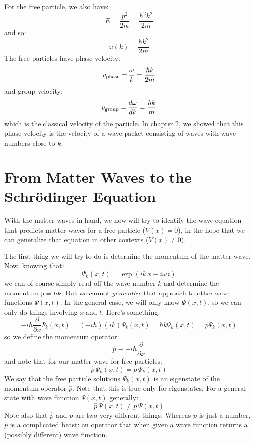\documentclass[12pt]{book}
\begin{document}
For the free particle, we also have:
\begin{equation}
E = \frac{p^2}{2m} = \frac{\hbar^2 k^2}{2m}
\end{equation}
and so:
\begin{equation}
\omega(k) = \frac{\hbar k^2}{2m} 
\end{equation}
The free particles have phase velocity:
$$v_{\rm phase} = \frac{\omega}{k} = \frac{\hbar k}{2m}$$
and group velocity:
$$v_{\rm group} = \frac{d\omega}{dk} = \frac{\hbar k}{m}$$
which is the classical velocity of the particle.  In chapter 2, we showed that this phase velocity is the velocity of a wave packet consisting of waves with wave numbers close to $k$.

 \section{From Matter Waves to the Schr\"odinger Equation}

With the matter waves in hand, we now will try to identify the wave equation that predicts matter waves for a free particle ($V(x)=0$), in the hope that we can generalize that equation in other contexts ($V(x) \neq 0$).

The first thing we will try to do is determine the momentum of the matter wave.  Now, knowing that:
$$\Psi_k(x,t) = \exp(ik\,x-i \omega \, t)$$
we can of course simply read off the wave number $k$ and determine the momentum $p=\hbar k$.  But we cannot {\it generalize} that approach to other wave functions $\Psi(x,t)$.  In the general case, we will only know $\Psi(x,t)$, so we can only do things involving $x$ and $t$.  Here's something:
$$-i\hbar \frac{\partial}{\partial x} \Psi_k(x,t) = (-i \hbar) (ik) \Psi_k(x,t) = \hbar k \Psi_k(x,t) = p \Psi_k(x,t)$$
so we define the momentum operator:
\begin{equation}
\hat{p} \equiv -i \hbar \frac{\partial}{\partial x}
\end{equation}
and note that for our matter wave for free particles:
\begin{equation}
\hat{p} \, \Psi_k(x,t) = p \, \Psi_k(x,t)
\end{equation}
We say that the free particle solutions $\Psi_k(x,t)$ is an eigenstate of the momentum operator $\hat{p}$.  Note that this is true only for eigenstates.  For a general state with wave function $\Psi(x,t)$ generally:
$$\hat{p} \, \Psi(x,t) \neq p \, \Psi(x,t)$$
Note also that $\hat{p}$ and $p$ are two very different things.  Whereas $p$ is just a number, $\hat{p}$ is a complicated beast: an operator that when given a wave function returns a (possibly different) wave function.
\end{document}

